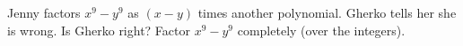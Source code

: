 Jenny factors $x^9-y^9$ as $(x-y)$ times another polynomial. Gherko tells her she is wrong. Is Gherko right? Factor $x^9-y^9$ completely (over the integers).
